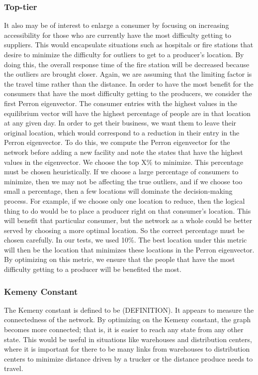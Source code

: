 \documentclass[twoside,twocolumn]{article}
\begin{document}
\subsubsection{Top-tier}
It also may be of interest to enlarge a consumer by focusing on increasing accessibility for those who are currently have the most difficulty getting to suppliers.
This would encapsulate situations such as hospitals or fire stations that desire to minimize the difficulty for outliers to get to a producer's location.
By doing this, the overall response time of the fire station will be decreased because the outliers are brought closer.
Again, we are assuming that the limiting factor is the travel time rather than the distance.
In order to have the most benefit for the consumers that have the most difficulty getting to the producers, we consider the first Perron eigenvector.
The consumer entries with the highest values in the equilibrium vector will have the highest percentage of people are in that location at any given day.
In order to get their business, we want them to leave their original location, which would correspond to a reduction in their entry in the Perron eigenvector.
To do this, we compute the Perron eigenvector for the network before adding a new facility and note the states that have the highest values in the eigenvector.
We choose the top X\% to minimize.
This percentage must be chosen heuristically.
If we choose a large percentage of consumers to minimize, then we may not be affecting the true outliers, and if we choose too small a percentage, then a few locations will dominate the decision-making process.
For example, if we choose only one location to reduce, then the logical thing to do would be to place a producer right on that consumer's location.
This will benefit that particular consumer, but the network as a whole could be better served by choosing a more optimal location.
So the correct percentage must be chosen carefully.
In our tests, we used 10\%.
The best location under this metric will then be the location that minimizes these locations in the Perron eigenvector.
By optimizing on this metric, we ensure that the people that have the most difficulty getting to a producer will be benefited the most.

\subsubsection{Kemeny Constant}
The Kemeny constant is defined to be (DEFINITION).
It appears to measure the connectedness of the network.
By optimizing on the Kemeny constant, the graph becomes more connected; that is, it is easier to reach any state from any other state.
This would be useful in situations like warehouses and distribution centers, where it is important for there to be many links from warehouses to distribution centers to minimize distance driven by a trucker or the distance produce needs to travel.
\end{document}

